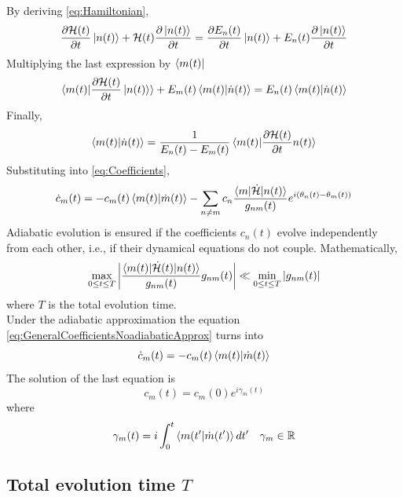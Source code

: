 By deriving \ref{eq:Hamiltonian},
\begin{equation}
    \frac{\partial \mathcal{H}(t)}{\partial t}\ket{n(t)} + \mathcal{H}(t)\frac{\partial \ket{n(t)}}{\partial t} = \frac{\partial E_{n}(t)}{\partial t} \ket{n(t)} + E_{n}(t)\frac{\partial \ket{n(t)}}{\partial t} 
\end{equation}
Multiplying the last expression by $\bra{m(t)}$ 
\begin{equation}
    \braket{m(t)|\frac{\partial\mathcal{H}(t)}{\partial t}\ket{n(t)}} + E_{m}(t)\braket{m(t)|\dot{n}(t)} = E_{n}(t)\braket{m(t)|\dot{n}(t)}
\end{equation}
Finally,
\begin{equation}
    \braket{m(t)|\dot{n}(t)} = \frac{1}{E_{n}(t)-E_{m}(t)}\braket{m(t)|\frac{\partial \mathcal{H}(t)}{\partial t}n(t)}
\end{equation}
Substituting into \ref{eq:Coefficients},
\begin{equation}
\label{eq:GeneralCoefficientsNoadiabaticApprox}
    \dot{c}_{m}(t) = -c_{m}(t) \braket{m(t)|\dot{m}(t)} - \sum_{n\neq m} c_{n}\frac{\braket{m|\dot{\mathcal{H}}|n(t)}}{g_{nm}(t)}e^{i\left(\theta_{n}(t) - \theta_{m}(t)\right)}
\end{equation}
Adiabatic evolution is ensured if the coefficients $c_{n}(t)$ evolve independently from each other, i.e., if their dynamical equations do not couple. Mathematically,
\begin{equation}
    \max_{0 \leq t \leq T} \abs{\frac{\braket{m(t)|\dot{\mathcal{H}}(t)|n(t)}}{g_{nm}(t)}{g_{nm}(t)}} \ll \min_{0\leq t \leq T} \abs{g_{nm}(t)}
\end{equation}
where $T$ is the total evolution time.\\ 
Under the adiabatic approximation the equation \ref{eq:GeneralCoefficientsNoadiabaticApprox} turns into
\begin{equation}
    \dot{c}_{m}(t) = -c_{m}(t)\braket{m(t)|\dot{m}(t)}
\end{equation}
The solution of the last equation is
\begin{equation}
    c_{m}(t) = c_{m}(0)e^{i\gamma_{m}(t)}
\end{equation}
where
\begin{equation}
    \gamma_{m}(t) = i\int_{0}^{t}\braket{m(t^{\prime}|\dot{m}(t^{\prime})}dt^{\prime} \quad \gamma_{m}\in \mathbb{R}
\end{equation}
\subsection{Total evolution time $T$}
